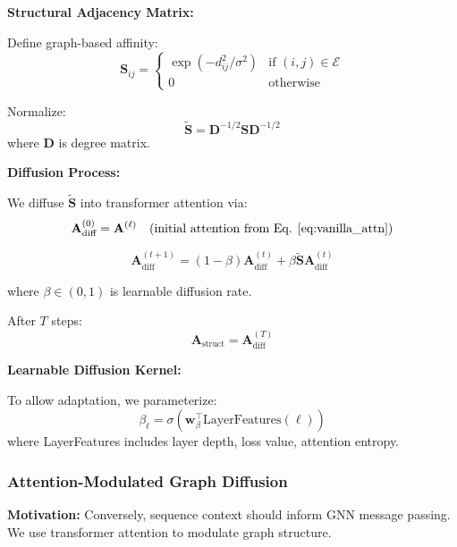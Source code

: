 \documentclass[12pt,en]{elegantpaper}
\begin{document}
\textbf{Structural Adjacency Matrix:}

Define graph-based affinity:
\begin{equation}
    \mathbf{S}_{ij} = \begin{cases}
        \exp(-d_{ij}^2 / \sigma^2) & \text{if } (i,j) \in \mathcal{E} \\
        0 & \text{otherwise}
    \end{cases}
\end{equation}

Normalize:
\begin{equation}
    \mathbf{\tilde{S}} = \mathbf{D}^{-1/2} \mathbf{S} \mathbf{D}^{-1/2}
\end{equation}
where $\mathbf{D}$ is degree matrix.

\textbf{Diffusion Process:}

We diffuse $\mathbf{\tilde{S}}$ into transformer attention via:
\begin{equation}
    \mathbf{A}_{\text{diff}}^{(0)} = \mathbf{A}^{(\ell)} \quad \text{(initial attention from Eq. \ref{eq:vanilla_attn})}
\end{equation}

\begin{equation}
    \mathbf{A}_{\text{diff}}^{(t+1)} = (1-\beta) \mathbf{A}_{\text{diff}}^{(t)} + \beta \mathbf{\tilde{S}} \mathbf{A}_{\text{diff}}^{(t)}
    \label{eq:attn_diffusion}
\end{equation}

where $\beta \in (0,1)$ is learnable diffusion rate.

After $T$ steps:
\begin{equation}
    \mathbf{A}_{\text{struct}} = \mathbf{A}_{\text{diff}}^{(T)}
\end{equation}

\textbf{Learnable Diffusion Kernel:}

To allow adaptation, we parameterize:
\begin{equation}
    \beta_{\ell} = \sigma(\mathbf{w}_\beta^\top \text{LayerFeatures}(\ell))
\end{equation}
where LayerFeatures includes layer depth, loss value, attention entropy.

\subsubsection{Attention-Modulated Graph Diffusion}

\textbf{Motivation:} Conversely, sequence context should inform GNN message passing. We use transformer attention to modulate graph structure.
\end{document}
